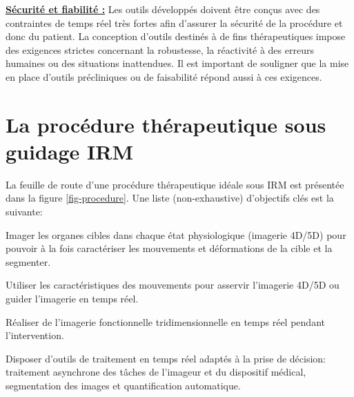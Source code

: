 
\underline{\textbf{Sécurité et fiabilité :}} Les outils développés doivent être conçus avec des contraintes de temps réel très fortes afin d’assurer la sécurité de la procédure et donc du patient. La conception d’outils destinés à de fins thérapeutiques impose des exigences strictes concernant la robustesse, la réactivité à des erreurs humaines ou des situations inattendues. Il est important de souligner que la mise en place d’outils précliniques ou de faisabilité répond aussi à ces exigences.

\section{La procédure thérapeutique sous guidage IRM}

La feuille de route d’une procédure thérapeutique idéale sous IRM est présentée dans la figure \ref{fig-procedure}. Une liste (non-exhaustive) d’objectifs clés est la suivante:



\begin{description}
\item Imager les organes cibles dans chaque état physiologique (imagerie 4D/5D) pour pouvoir à la fois caractériser les mouvements et déformations de la cible et la segmenter.
\item  Utiliser les caractéristiques des mouvements pour asservir l’imagerie 4D/5D ou guider l’imagerie en temps réel.
\item  Réaliser de l’imagerie fonctionnelle tridimensionnelle en temps réel pendant l’intervention.
\item  Disposer d’outils de traitement en temps réel adaptés à la prise de décision: traitement asynchrone des tâches de l’imageur et du dispositif médical, segmentation des images et quantification automatique.
\end{description}

